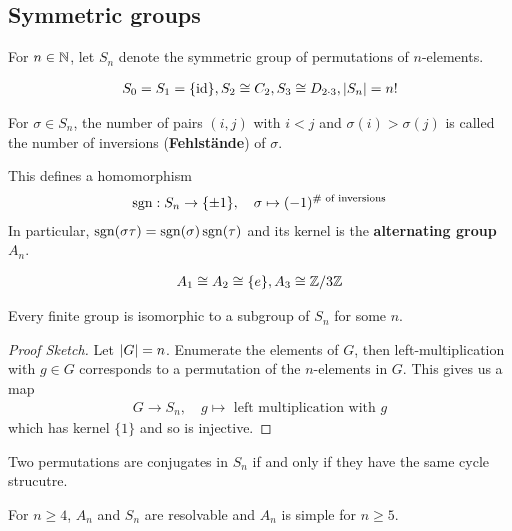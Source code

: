 
\subsection{Symmetric groups}
For $n \in \mathbb{N}$, let $S_n$ denote the symmetric group of permutations of $n$-elements.

\begin{align*}
  S_0 = S_1 = \{\operatorname{id}\}, S_2 \cong C_2, S_3 \cong D_{2 \cdot 3}, \vert S_n\vert = n!
\end{align*}

\begin{dfn}[]
  For $\sigma \in S_n$, the number of pairs $(i,j)$ with $i< j$ and $\sigma(i) > \sigma(j)$ is called the number of inversions (\textbf{Fehlstände}) of $\sigma$.

  This defines a homomorphism 
  \begin{align*}
    \operatorname{sgn} : S_n \to  \{\pm 1\}, \quad \sigma \mapsto (-1)^{\# \text{ of inversions}}
  \end{align*}
  In particular, $\operatorname{sgn}(\sigma \tau) = \operatorname{sgn}(\sigma) \operatorname{sgn} (\tau)$ and its kernel is the \textbf{alternating group} $A_n$.
\end{dfn}

\begin{align*}
  A_1 \cong A_2 \cong \{e\}, A_3 \cong \mathbb{Z}/3\mathbb{Z}
\end{align*}



\begin{thm}[Cayley]
  Every finite group is isomorphic to a subgroup of $S_n$ for some $n$.
\end{thm}
\begin{proof}[Proof Sketch]
  Let $\vert G\vert = n$. Enumerate the elements of $G$, then left-multiplication with $g \in G$ corresponds to a permutation of the $n$-elements in $G$.
  This gives us a map
  \begin{align*}
    G \to  S_n, \quad g \mapsto \text{ left multiplication with }g
  \end{align*}
  which has kernel $\{1\}$ and so is injective.
\end{proof}


\begin{prop}[]
Two permutations are conjugates in $S_n$ if and only if they have the same cycle strucutre.
\end{prop}

\begin{thm}[]
For $n \geq 4$, $A_n$ and $S_n$ are resolvable and $A_n$ is simple for $n \geq 5$.
\end{thm}


